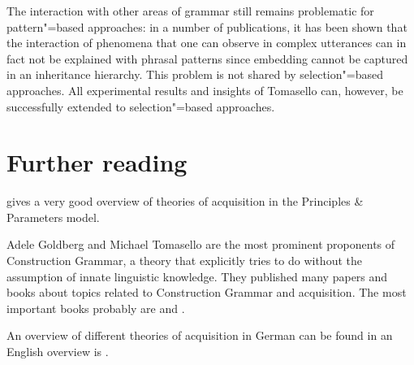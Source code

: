 The interaction with other areas of grammar still remains problematic for pattern"=based approaches: in a number of publications, it has been shown
that the interaction of phenomena that one can observe in complex utterances can in fact not be explained with phrasal patterns since
embedding cannot be captured in an inheritance hierarchy. This problem is not shared by selection"=based approaches. All experimental results and insights
of Tomasello can, however, be successfully extended to selection"=based approaches.%


\section*{Further reading}

\citet{Meisel95a} gives a very good overview of theories of acquisition in the Principles \& Parameters model.

Adele Goldberg and Michael Tomasello are the most prominent proponents of Construction Grammar, a theory that explicitly tries
to do without the assumption of innate linguistic knowledge. They published many papers and books
about topics related to Construction Grammar and acquisition. The most important books probably are  and .

An overview of different theories of acquisition in German can be found in \citet{KD2008a} an
English overview is .



